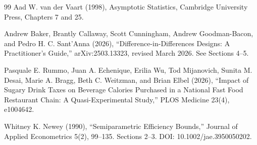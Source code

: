 \documentclass{article}
\begin{document}
\begin{thebibliography}{99}
   Aad W. van der Vaart (1998), Asymptotic Statistics, Cambridge University Press, Chapters 7 and 25.

   Andrew Baker, Brantly Callaway, Scott Cunningham, Andrew Goodman-Bacon, and Pedro H. C. Sant'Anna (2026), ``Difference-in-Differences Designs: A Practitioner's Guide,'' arXiv:2503.13323, revised March 2026. See Sections 4--5.

   Pasquale E. Rummo, Juan A. Echenique, Erilia Wu, Tod Mijanovich, Sunita M. Desai, Marie A. Bragg, Beth C. Weitzman, and Brian Elbel (2026), ``Impact of Sugary Drink Taxes on Beverage Calories Purchased in a National Fast Food Restaurant Chain: A Quasi-Experimental Study,'' PLOS Medicine 23(4), e1004642.

   Whitney K. Newey (1990), ``Semiparametric Efficiency Bounds,'' Journal of Applied Econometrics 5(2), 99--135. Sections 2--3. DOI: 10.1002/jae.3950050202.

\end{thebibliography}
\end{document}
